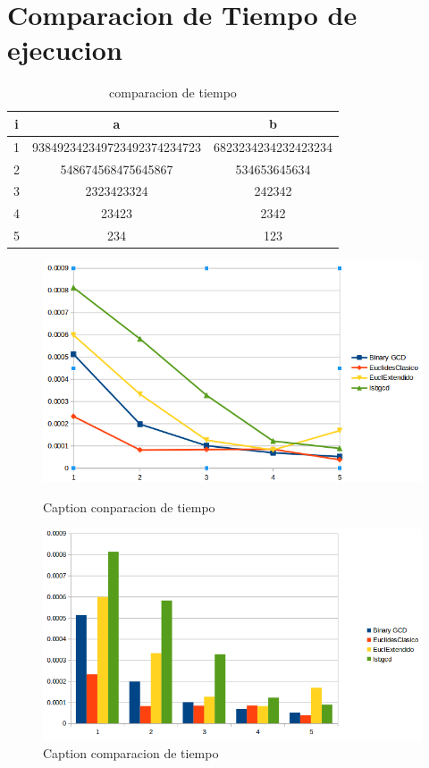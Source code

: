 \section{Comparacion de Tiempo de ejecucion}
\begin{table}[H]
\label{tablax}
\begin{center}
\begin{tabular}{|c|c|c|}
\hline 
i&a&b \\
\hline
1&938492342349723492374234723&6823234234232423234\\\hline
2&548674568475645867&534653645634\\\hline
3&2323423324&242342\\\hline
4&23423&2342\\\hline
5&234&123\\\hline
\end{tabular}
\end{center}
\caption{comparacion de tiempo}
\end{table}

\begin{figure}
    \centering
    \includegraphics[scale=0.4]{pictures/dispersion.png}
    \caption{Caption conparacion de tiempo }
    
    \includegraphics[scale=0.4]{pictures/barras.png}
    \caption{Caption comparacion de tiempo}
    
    \label{fig:my_label}
\end{figure}


